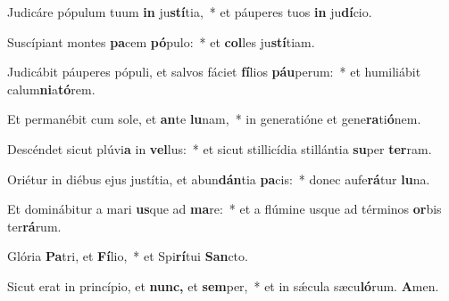 \item Judicáre pópulum tuum \textbf{in} ju\textbf{stí}tia,~* et páuperes tuos \textbf{in} ju\textbf{dí}cio.
\item Suscípiant montes \textbf{pa}cem \textbf{pó}pulo:~* et \textbf{col}les ju\textbf{stí}tiam.
\item Judicábit páuperes pópuli, et salvos fáciet \textbf{fí}lios \textbf{páu}perum:~* et humiliábit calum\textbf{ni}a\textbf{tó}rem.
\item Et permanébit cum sole, et \textbf{an}te \textbf{lu}nam,~* in generatióne et gene\textbf{ra}ti\textbf{ó}nem.
\item Descéndet sicut plúvi\textbf{a} in \textbf{vel}lus:~* et sicut stillicídia stillántia \textbf{su}per \textbf{ter}ram.
\item Oriétur in diébus ejus justítia, et abun\textbf{dán}tia \textbf{pa}cis:~* donec aufe\textbf{rá}tur \textbf{lu}na.
\item Et dominábitur a mari \textbf{us}que ad \textbf{ma}re:~* et a flúmine usque ad términos \textbf{or}bis ter\textbf{rá}rum.
\item Glória \textbf{Pa}tri, et \textbf{Fí}lio,~* et Spi\textbf{rí}tui \textbf{San}cto.
\item Sicut erat in princípio, et \textbf{nunc,} et \textbf{sem}per,~* et in sǽcula sæcu\textbf{ló}rum. \textbf{A}men.